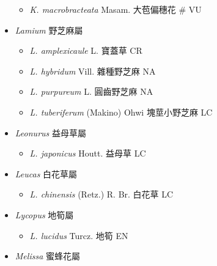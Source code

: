 \begin{itemize}
  \begin{itemize}
        \item[] \textit{K. macrobracteata} Masam.  大苞偏穗花  \# VU
  \end{itemize}
 \item[] \textit{Lamium} 野芝麻屬
                                
  \begin{itemize}
        \item[] \textit{L. amplexicaule} L.  寶蓋草   CR
        \item[] \textit{L. hybridum} Vill.  雜種野芝麻   NA
        \item[] \textit{L. purpureum} L.  圓齒野芝麻   NA
        \item[] \textit{L. tuberiferum} (Makino) Ohwi  塊莖小野芝麻   LC
  \end{itemize}
 \item[] \textit{Leonurus} 益母草屬
                                
  \begin{itemize}
        \item[] \textit{L. japonicus} Houtt.  益母草   LC
  \end{itemize}
 \item[] \textit{Leucas} 白花草屬
                                
  \begin{itemize}
        \item[] \textit{L. chinensis} (Retz.) R. Br.  白花草   LC
  \end{itemize}
 \item[] \textit{Lycopus} 地筍屬
                                
  \begin{itemize}
        \item[] \textit{L. lucidus} Turcz.  地筍   EN
  \end{itemize}
 \item[] \textit{Melissa} 蜜蜂花屬
                                

\end{itemize}
